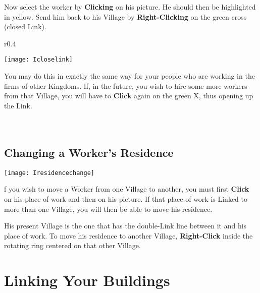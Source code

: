 Now select the worker by \textbf{Clicking} on his picture. He should then be highlighted in yellow. Send him back to his Village by \textbf{Right-Clicking} on the green cross (closed Link).

\begin{wrapfigure}{r}{0.4\textwidth}
	\vspace{-20pt}
	\begin{center}
		\texttt{[image: Icloselink]} %
	\end{center}
	\vspace{-10pt}
\end{wrapfigure}


You may do this in exactly the same way for your people who are working in the firms of other Kingdoms. If, in the future, you wish to hire some more workers from that Village, you will have to \textbf{Click} again on the green X, thus opening up the Link. \\ \\ \\ %

\subsection{\textsf{Changing a Worker’s Residence}}


\begin{center}
    \texttt{[image: Iresidencechange]} %
\end{center}

f you wish to move a Worker from one Village to another, you must first \textbf{Click} on his place of work and then on his picture. If that place of work is Linked to more than one Village, you will then be able to move his residence.


His present Village is the one that has the double-Link line between it and his place of work. To move his residence to another Village, \textbf{Right-Click} inside the rotating ring centered on that other Village.

\section{\textsf{Linking Your Buildings}}

